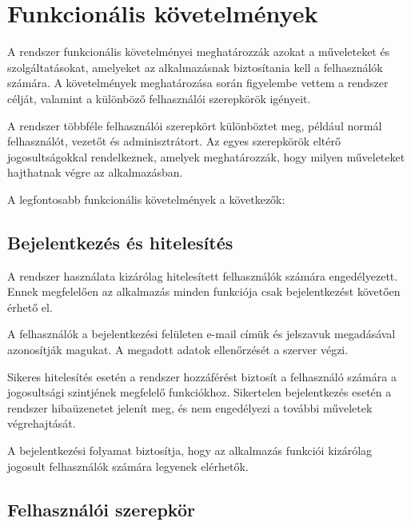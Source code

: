 \documentclass[
]{thesis-ekf}
\theoremstyle{definition}
\theoremstyle{remark}
\begin{document}
\section{Funkcionális követelmények}

A rendszer funkcionális követelményei meghatározzák azokat a műveleteket és szolgáltatásokat, amelyeket az alkalmazásnak biztosítania kell a felhasználók számára. A követelmények meghatározása során figyelembe vettem a rendszer célját, valamint a különböző felhasználói szerepkörök igényeit.

A rendszer többféle felhasználói szerepkört különböztet meg, például normál felhasználót, vezetőt és adminisztrátort. Az egyes szerepkörök eltérő jogosultságokkal rendelkeznek, amelyek meghatározzák, hogy milyen műveleteket hajthatnak végre az alkalmazásban.

A legfontosabb funkcionális követelmények a következők:

\subsection{Bejelentkezés és hitelesítés}

A rendszer használata kizárólag hitelesített felhasználók számára engedélyezett. Ennek megfelelően az alkalmazás minden funkciója csak bejelentkezést követően érhető el.

A felhasználók a bejelentkezési felületen e-mail címük és jelszavuk megadásával azonosítják magukat. A megadott adatok ellenőrzését a szerver végzi.

Sikeres hitelesítés esetén a rendszer hozzáférést biztosít a felhasználó számára a jogosultsági szintjének megfelelő funkciókhoz. Sikertelen bejelentkezés esetén a rendszer hibaüzenetet jelenít meg, és nem engedélyezi a további műveletek végrehajtását.

A bejelentkezési folyamat biztosítja, hogy az alkalmazás funkciói kizárólag jogosult felhasználók számára legyenek elérhetők.

\subsection{Felhasználói szerepkör}
\end{document}
